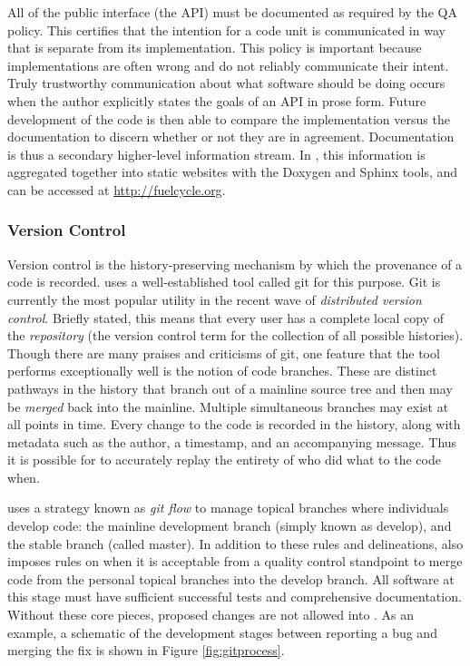 All of the public interface (the \gls{API}) must be documented as required by the \Cyclus
\gls{QA} policy. This certifies that the intention for a code unit is communicated 
in way that is separate from its implementation. This policy is important 
because implementations are often wrong and do not reliably communicate their intent. Truly trustworthy communication about what 
software should be doing occurs when the author explicitly states the 
goals of an \gls{API} in prose form. Future development of the code is then able to 
compare the implementation versus the documentation to discern whether or not they 
are in agreement. Documentation is thus a secondary higher-level information 
stream.  In \Cyclus, this information is aggregated together into static 
websites with the Doxygen \cite{van_heesch_doxygen:_2008} and Sphinx 
\cite{brandl_sphinx_2014} 
tools, and can be accessed at \url{http://fuelcycle.org}.

\subsubsection{Version Control}

Version control is the history-preserving mechanism by which the provenance of 
a code is recorded. \Cyclus uses a well-established tool called git 
\cite{software_freedom_conservancy_git_2014}
for this purpose. Git is currently the most popular utility in the recent wave
of \emph{distributed version control}. Briefly stated, this means that every 
user has a complete local copy of the \emph{repository} (the version control
term for the collection of all possible histories).
Though there are many praises and criticisms of git, one 
feature that the tool performs exceptionally well is the notion of code branches.
These are distinct pathways in the history that branch out of a mainline source
tree and then may be \emph{merged} back into the mainline. Multiple simultaneous
branches may exist at all points in time. Every change to the code is recorded
in the history, along with metadata such as the author, a timestamp, and an 
accompanying message. Thus 
it is possible for \Cyclus to accurately replay the entirety of who did what to the
code when.

\Cyclus uses a strategy known as \emph{git flow} 
\cite{kalliamvakou_code-centric_2014} 
to manage topical branches where individuals develop code: the mainline development
branch (simply known as develop), and the stable branch (called master).
In addition to these rules and delineations, \Cyclus also imposes rules on 
when it is acceptable from a quality control standpoint to merge code from 
the personal topical branches into the develop branch. All software at this stage 
must have sufficient successful tests and comprehensive documentation. Without
these core pieces, proposed changes are not allowed into \Cyclus. As an example, a schematic of 
the development stages between reporting a bug and merging the fix is shown in 
Figure \ref{fig:gitprocess}. 

